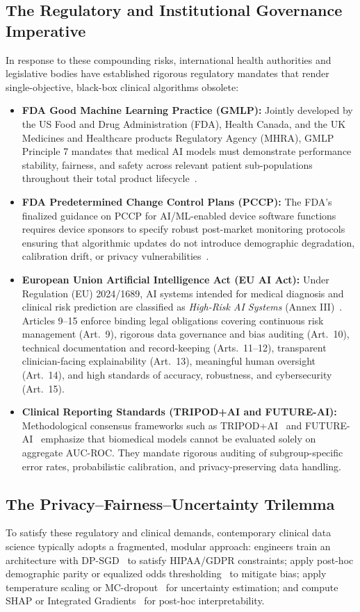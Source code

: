 \documentclass[3p,12pt]{elsarticle}
\theoremstyle{plain}
\theoremstyle{definition}
\begin{document}
\subsection{The Regulatory and Institutional Governance Imperative}
In response to these compounding risks, international health authorities and legislative bodies have established rigorous regulatory mandates that render single-objective, black-box clinical algorithms obsolete:
\begin{itemize}
    \item \textbf{FDA Good Machine Learning Practice (GMLP):} Jointly developed by the US Food and Drug Administration (FDA), Health Canada, and the UK Medicines and Healthcare products Regulatory Agency (MHRA), GMLP Principle 7 mandates that medical AI models must demonstrate performance stability, fairness, and safety across relevant patient sub-populations throughout their total product lifecycle~\cite{fda2021gmlp}.
    \item \textbf{FDA Predetermined Change Control Plans (PCCP):} The FDA's finalized guidance on PCCP for AI/ML-enabled device software functions requires device sponsors to specify robust post-market monitoring protocols ensuring that algorithmic updates do not introduce demographic degradation, calibration drift, or privacy vulnerabilities~\cite{fda2024pccp}.
    \item \textbf{European Union Artificial Intelligence Act (EU AI Act):} Under Regulation (EU) 2024/1689, AI systems intended for medical diagnosis and clinical risk prediction are classified as \emph{High-Risk AI Systems} (Annex III)~\cite{euaiact2024}. Articles 9--15 enforce binding legal obligations covering continuous risk management (Art.~9), rigorous data governance and bias auditing (Art.~10), technical documentation and record-keeping (Arts.~11--12), transparent clinician-facing explainability (Art.~13), meaningful human oversight (Art.~14), and high standards of accuracy, robustness, and cybersecurity (Art.~15).
    \item \textbf{Clinical Reporting Standards (TRIPOD+AI and FUTURE-AI):} Methodological consensus frameworks such as TRIPOD+AI~\cite{tripodai2024} and FUTURE-AI~\cite{futureai2023} emphasize that biomedical models cannot be evaluated solely on aggregate AUC-ROC. They mandate rigorous auditing of subgroup-specific error rates, probabilistic calibration, and privacy-preserving data handling.
\end{itemize}

\subsection{The Privacy--Fairness--Uncertainty Trilemma}
To satisfy these regulatory and clinical demands, contemporary clinical data science typically adopts a fragmented, modular approach: engineers train an architecture with DP-SGD~\cite{abadi2016deep} to satisfy HIPAA/GDPR constraints; apply post-hoc demographic parity or equalized odds thresholding~\cite{hardt2016equality} to mitigate bias; apply temperature scaling or MC-dropout~\cite{gal2016dropout} for uncertainty estimation; and compute SHAP or Integrated Gradients~\cite{sundararajan2017axiomatic,lundberg2017unified} for post-hoc interpretability.
\end{document}

